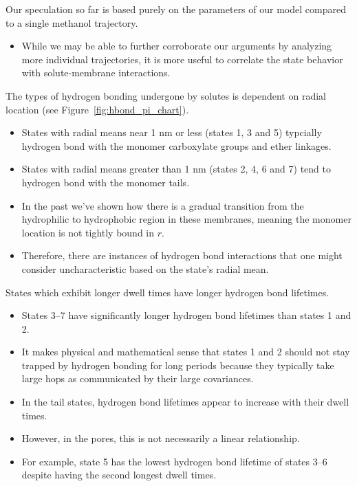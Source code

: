 \documentclass{article}
\begin{document}
  Our speculation so far is based purely on the parameters of our model compared to 
  a single methanol trajectory.
  \begin{itemize}
    \item While we may be able to further corroborate our arguments by analyzing more
    individual trajectories, it is more useful to correlate the state behavior with
    solute-membrane interactions.
  \end{itemize}   

  The types of hydrogen bonding undergone by solutes is dependent on radial
  location (see Figure~\ref{fig:hbond_pi_chart}).
  \begin{itemize}
    \item States with radial means near 1 nm or less (states 1, 3 and 5) typcially
    hydrogen bond with the monomer carboxylate groups and ether linkages.
    \item States with radial means greater than 1 nm (states 2, 4, 6 and 7) tend 
    to hydrogen bond with the monomer tails.
    \item In the past we've shown how there is a gradual transition from the
  	hydrophilic to hydrophobic region in these membranes, meaning the monomer
  	location is not tightly bound in $r$.
  	\item Therefore, there are instances of hydrogen bond interactions that one
  	might consider uncharacteristic based on the state's radial mean.
  \end{itemize}  
  
  States which exhibit longer dwell times have longer hydrogen bond lifetimes.
  \begin{itemize}
    \item States 3--7 have significantly longer hydrogen bond lifetimes than states
    1 and 2. 
    \item It makes physical and mathematical sense that states 1 and 2 should not 
    stay trapped by hydrogen bonding for long periods because they typically take large
    hops as communicated by their large covariances.
    \item In the tail states, hydrogen bond lifetimes appear to increase with 
    their dwell times.
    \item However, in the pores, this is not necessarily a linear relationship. 
    \item For example, state 5 has the lowest hydrogen bond lifetime of states 3--6
    despite having the second longest dwell times. 
  \end{itemize}
  
\end{document}
